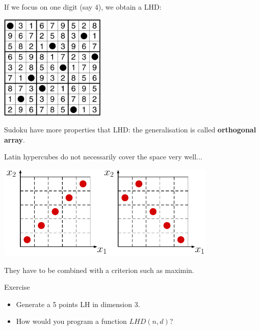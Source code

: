 \documentclass{beamer}
\begin{document}
\begin{frame}{}
If we focus on one digit (say $4$), we obtain a LHD:
\vspace{2mm}
\begin{center}
\includegraphics[height=5cm]{figures/latexdraw/sudoku}
\end{center}
Sudoku have more properties that LHD: the generalisation is called \textbf{orthogonal array}.
\end{frame}

\begin{frame}{}
Latin hypercubes do not necessarily cover the space very well...
\begin{center}
\includegraphics[height=4.5cm]{figures/latexdraw/lhs2}
\end{center}
They have to be combined with a criterion such as maximin.
\end{frame}

\begin{frame}{}
\begin{exampleblock}{Exercise}
\begin{itemize}
	\item Generate a 5 points LH in dimension 3.
	\item How would you program a function $LHD(n,d)$? 
\end{itemize}
\end{exampleblock}
\end{frame}
\end{document}
